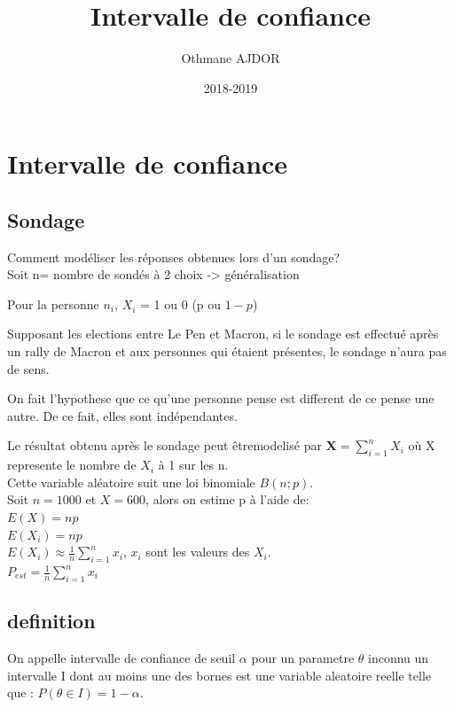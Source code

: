\documentclass[11pt]{article}
\title{Intervalle de confiance}
\author{Othmane AJDOR}
\date{2018-2019}
\begin{document}
\maketitle

\pagebreak

\tableofcontents

\pagebreak

\section{Intervalle de confiance}

\subsection{Sondage}
Comment modéliser les réponses obtenues lors d'un sondage?\\
Soit n= nombre de sondés à 2 choix -> généralisation

Pour la personne $n_{i}$, $X^{}_{i}$ = 1 ou 0 (p ou $1-p$)

Supposant les elections entre Le Pen et Macron, si le sondage est effectué après un rally de Macron et aux personnes qui étaient présentes, le sondage n'aura pas de sens.

On fait l'hypothese que ce qu'une personne pense est different de ce pense une autre. De ce fait, elles sont indépendantes.

Le résultat obtenu après le sondage peut êtremodelisé par $\textbf{X} = \sum_{i=1}^{n} X_{i}$ où X represente le nombre de $X_{i}$ à 1 sur les n.\\
Cette variable aléatoire suit une loi binomiale $B(n;p)$.\\
Soit $n=1000$ et $X=600$, alors on estime p à l'aide de:\\

$E(X) = np$\\
    $E(X_{i}) = np$\\
    $E(X_{i}) \approx \frac{1}{n}\sum_{i=1}^{n}x_{i}$, $x_{i}$ sont les valeurs des $X_{i}$.\\
    $P_{est} = \frac{1}{n}\sum_{i=1}^{n}x_{i}$

\subsection{definition}
On appelle intervalle de confiance de seuil $\alpha$ pour un parametre $\theta$ inconnu un intervalle I dont au moins une des bornes est une variable aleatoire reelle telle que :
$P(\theta \in I) = 1 - \alpha$.
\end{document}
